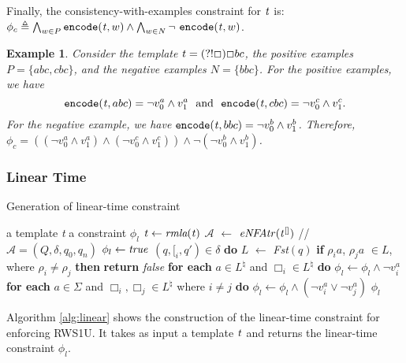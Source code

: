 \documentclass[conference]{IEEEtran}
\newcommand{\idt}{\hspace{0.5cm}}
\newcommand{\hole}{\Box}
\newcommand{\sstate}{{\it t}}
\newcommand{\follow}{\textit{Fst}}
\newcommand{\toENFA}{{\it eNFAtr}}
\newcommand{\ltp}{RWS1U}
\newcommand{\removela}{\textit{rmla}}
\newtheorem{example}{Example}[section]
\begin{document}
Finally, the consistency-with-examples constraint for $\sstate$ is:
$\phi_c \triangleq \bigwedge_{w \in P} {\tt encode}(\sstate, w) \land \bigwedge_{w \in N}  \lnot~ {\tt encode}(\sstate, w)$.
\begin{example}
\normalfont
Consider the template $\sstate{} = (?!\hole)\hole bc$, the positive examples $P = \{ abc, cbc\}$, and the negative examples $N = \{bbc\}$.
For the positive examples, we have
\[
{\tt encode}(\sstate, abc) = \lnot v_0^a \land v_1^a \ \text{ and } \  {\tt encode}(\sstate, cbc) = \lnot v_0^c \land v_1^c.
\]
For the negative example, we have ${\tt encode}(\sstate, bbc) = \lnot v_0^b \land v_1^b$.
Therefore, $\phi_c = ( ( \lnot v_0^a \land v_1^a ) \land ( \lnot v_0^c \land v_1^c ) ) \land \lnot ( \lnot v_0^b \land v_1^b )$.

\end{example}












\subsubsection{Linear Time}
\label{subsec:oneprop}

\begin{algorithm}[t]
\caption{Generation of linear-time constraint}
\label{alg:linear}
\begin{algorithmic}[1]
\REQUIRE a template \sstate{}
\ENSURE a constraint $\phi_l$
\STATE $\sstate{} \leftarrow \removela(\sstate{})$
\STATE $\mathcal{A}$ $\leftarrow$ $\toENFA(\sstate{}^{[]})$ // $\mathcal{A} = (Q, \delta, q_0, q_n)$
\STATE $\phi_l \leftarrow {\it true}$
 $(q, [_i, q') \in \delta$ {\bf do}
\STATE \idt{} $L$ $\leftarrow$ {\follow}$(q)$
\STATE \idt{} {\bf if} $\rho_ia$, $\rho_ja$ $\in L$, where $\rho_i \neq \rho_j$ {\bf then}
\STATE \idt{} \idt{} {\bf return} {\it false}
\STATE \idt{} {\bf for each} $a \in L^{\natural}$ and $\hole_i \in L^{\natural}$ {\bf do}
\STATE \idt{} \idt{} $\phi_l \leftarrow \phi_l \land \lnot v_i^a$
\STATE \idt{} {\bf for each} $a \in \Sigma$ and $\hole_i, \hole_j \in L^{\natural}$ where $i \neq j$ {\bf do}
\STATE \idt{} \idt{} $\phi_l \leftarrow \phi_l \land (\neg v_i^a \vee \neg v_j^a)$
 $\phi_l$
\end{algorithmic}
\end{algorithm}

Algorithm \ref{alg:linear} shows the construction of the linear-time constraint for enforcing \ltp{}.  It takes as input a template $\sstate$ and returns the linear-time constraint $\phi_l$.
\end{document}
